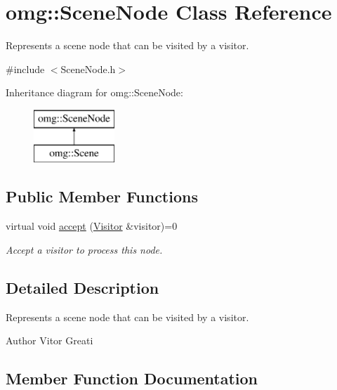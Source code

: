 \hypertarget{classomg_1_1_scene_node}{}\section{omg\+::Scene\+Node Class Reference}
\label{classomg_1_1_scene_node}


Represents a scene node that can be visited by a visitor.  




{\ttfamily \#include $<$Scene\+Node.\+h$>$}

Inheritance diagram for omg\+::Scene\+Node\+:\begin{figure}[H]
\begin{center}
\leavevmode
\includegraphics[height=2.000000cm]{classomg_1_1_scene_node}
\end{center}
\end{figure}
\subsection*{Public Member Functions}
\begin{DoxyCompactItemize}
\item 
virtual void \mbox{\hyperlink{classomg_1_1_scene_node_ad8e1595d15c4b92ab505828a0633a4d9}{accept}} (\mbox{\hyperlink{classomg_1_1_visitor}{Visitor}} \&visitor)=0
\begin{DoxyCompactList}\small\item\em Accept a visitor to process this node. \end{DoxyCompactList}\end{DoxyCompactItemize}


\subsection{Detailed Description}
Represents a scene node that can be visited by a visitor. 

\begin{DoxyAuthor}{Author}
Vitor Greati 
\end{DoxyAuthor}


\subsection{Member Function Documentation}
\mbox{\label{classomg_1_1_scene_node_ad8e1595d15c4b92ab505828a0633a4d9}} 
